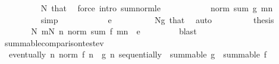 \begin{isabellebody}
\ \ \ \ \ \ \ \ \isamarkupfalse%
\ N\ that\ \isamarkupfalse%
\ {\isacharparenleft}{\kern0pt}force\ intro{\isacharcolon}{\kern0pt}\ sum{\isacharunderscore}{\kern0pt}norm{\isacharunderscore}{\kern0pt}le{\isacharparenright}{\kern0pt}\isanewline
\ \ \ \ \ \ \isamarkupfalse%
\ \isamarkupfalse%
\ {\isachardoublequoteopen}{\isachardot}{\kern0pt}{\isachardot}{\kern0pt}{\isachardot}{\kern0pt}\ {\isasymle}\ norm\ {\isacharparenleft}{\kern0pt}sum\ g\ {\isacharbraceleft}{\kern0pt}m{\isachardot}{\kern0pt}{\isachardot}{\kern0pt}{\isacharless}{\kern0pt}n{\isacharbraceright}{\kern0pt}{\isacharparenright}{\kern0pt}{\isachardoublequoteclose}\isanewline
\ \ \ \ \ \ \ \ \isamarkupfalse%
\ simp\isanewline
\ \ \ \ \ \ \isamarkupfalse%
\ \isamarkupfalse%
\ {\isachardoublequoteopen}{\isachardot}{\kern0pt}{\isachardot}{\kern0pt}{\isachardot}{\kern0pt}\ {\isacharless}{\kern0pt}\ e{\isachardoublequoteclose}\isanewline
\ \ \ \ \ \ \ \ \isamarkupfalse%
\ Ng\ that\ \isamarkupfalse%
\ auto\isanewline
\ \ \ \ \ \ \isamarkupfalse%
\ \isamarkupfalse%
\ {\isacharquery}{\kern0pt}thesis\ \isacommand{{\isachardot}{\kern0pt}}\isamarkupfalse%
\isanewline
\ \ \ \ \isamarkupfalse%
\isanewline
\ \ \ \ \isamarkupfalse%
\ \isamarkupfalse%
\ {\isachardoublequoteopen}{\isasymexists}N{\isachardot}{\kern0pt}\ {\isasymforall}m{\isasymge}N{\isachardot}{\kern0pt}\ {\isasymforall}n{\isachardot}{\kern0pt}\ norm\ {\isacharparenleft}{\kern0pt}sum\ f\ {\isacharbraceleft}{\kern0pt}m{\isachardot}{\kern0pt}{\isachardot}{\kern0pt}{\isacharless}{\kern0pt}n{\isacharbraceright}{\kern0pt}{\isacharparenright}{\kern0pt}\ {\isacharless}{\kern0pt}\ e{\isachardoublequoteclose}\ \isanewline
\ \ \ \ \ \ \isamarkupfalse%
\ blast\isanewline
\ \ \isamarkupfalse%
\isanewline
{}\isamarkupfalse%
%
\endisatagproof
{\isafoldproof}%
%
\isadelimproof
\isanewline
%
\endisadelimproof
\isanewline
{}\isamarkupfalse%
\ summable{\isacharunderscore}{\kern0pt}comparison{\isacharunderscore}{\kern0pt}test{\isacharunderscore}{\kern0pt}ev{\isacharcolon}{\kern0pt}\isanewline
\ \ {\isachardoublequoteopen}eventually\ {\isacharparenleft}{\kern0pt}{\isasymlambda}n{\isachardot}{\kern0pt}\ norm\ {\isacharparenleft}{\kern0pt}f\ n{\isacharparenright}{\kern0pt}\ {\isasymle}\ g\ n{\isacharparenright}{\kern0pt}\ sequentially\ {\isasymLongrightarrow}\ summable\ g\ {\isasymLongrightarrow}\ summable\ f{\isachardoublequoteclose}\isanewline

\end{isabellebody}
